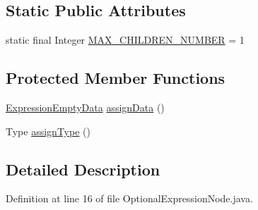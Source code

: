 \subsection*{Static Public Attributes}
\begin{DoxyCompactItemize}
\item 
static final Integer \hyperlink{classit_1_1emarolab_1_1cagg_1_1core_1_1language_1_1syntax_1_1expressionTree_1_1expressionNodeType_1_1OptionalExpressionNode_a8f03581e06771b19451b5a5370b619d1}{M\-A\-X\-\_\-\-C\-H\-I\-L\-D\-R\-E\-N\-\_\-\-N\-U\-M\-B\-E\-R} = 1
\end{DoxyCompactItemize}
\subsection*{Protected Member Functions}
\begin{DoxyCompactItemize}
\item 
\hyperlink{classit_1_1emarolab_1_1cagg_1_1core_1_1language_1_1syntax_1_1expressionTree_1_1ExpressionDataFactory_1_1ExpressionEmptyData}{Expression\-Empty\-Data} \hyperlink{classit_1_1emarolab_1_1cagg_1_1core_1_1language_1_1syntax_1_1expressionTree_1_1expressionNodeType_1_1OptionalExpressionNode_a1d7057a3bd49e7e872eb20b96ec66c88}{assign\-Data} ()
\item 
Type \hyperlink{classit_1_1emarolab_1_1cagg_1_1core_1_1language_1_1syntax_1_1expressionTree_1_1expressionNodeType_1_1OptionalExpressionNode_a4dda204a7d7926c021b48a2ee2e849de}{assign\-Type} ()
\end{DoxyCompactItemize}


\subsection{Detailed Description}


Definition at line 16 of file Optional\-Expression\-Node.\-java.



